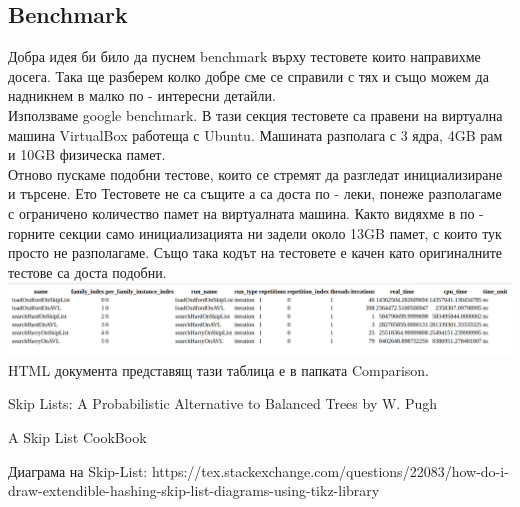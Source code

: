 \documentclass[a4paper,12pt,fleqn]{article}
\begin{document}
\subsection{Benchmark}
Добра идея би било да пуснем benchmark върху тестовете които направихме досега. Така ще разберем колко добре сме се справили с тях и също можем да надникнем в малко по - интересни детайли.\\
Използваме google benchmark. В тази секция тестовете са правени на виртуална машина VirtualBox работеща с Ubuntu. Машината разполага с 3 ядра, 4GB рам и 10GB физическа памет.\\
Отново пускаме подобни тестове, които се стремят да разгледат инициализиране и търсене. Ето Тестовете не са същите а са доста по - леки, понеже разполагаме с ограничено количество памет на виртуалната машина. Както видяхме в по -  горните секции само инициализацията ни задели около 13GB памет, с които тук просто не разполагаме. Също така кодът на тестовете е качен като оригиналните тестове са доста подобни.\\
\includegraphics[scale=0.25]{html-final.png}\\
HTML документа представящ тази таблица е в папката Comparison.

\begin{thebibliography}{9}
 Skip Lists: A Probabilistic Alternative to Balanced Trees by W. Pugh

 A Skip List CookBook

 Диаграма на Skip-List: https://tex.stackexchange.com/questions/22083/how-do-i-draw-extendible-hashing-skip-list-diagrams-using-tikz-library
\end{thebibliography}
\end{document}
